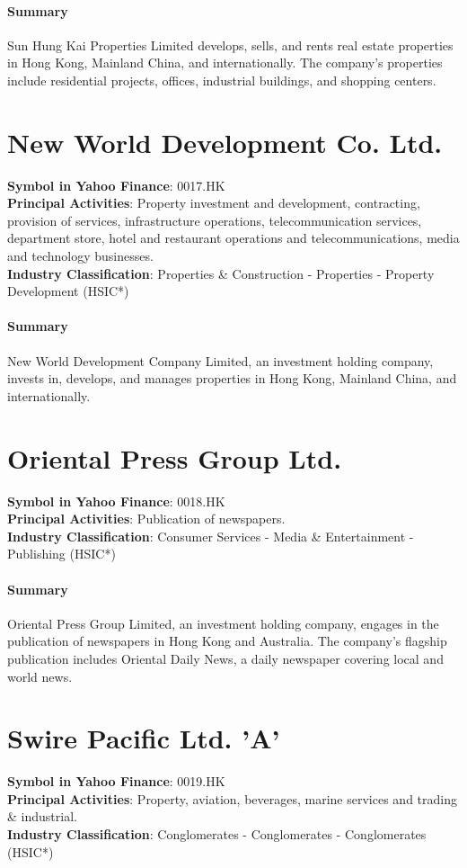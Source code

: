 \paragraph{Summary}
Sun Hung Kai Properties Limited develops, sells, and rents real estate properties in Hong Kong, Mainland China, and internationally. The company's properties include residential projects, offices, industrial buildings, and shopping centers.


\section{New World Development Co. Ltd.}
\textbf{Symbol in Yahoo Finance}: 0017.HK\\
\textbf{Principal Activities}: Property investment and development, contracting, provision of services, infrastructure operations, telecommunication services, department store, hotel and restaurant operations and telecommunications, media and technology businesses.\\
\textbf{Industry Classification}: Properties \& Construction - Properties - Property Development (HSIC*)
\paragraph{Summary}
New World Development Company Limited, an investment holding company, invests in, develops, and manages properties in Hong Kong, Mainland China, and internationally.


\section{Oriental Press Group Ltd.}
\textbf{Symbol in Yahoo Finance}: 0018.HK\\
\textbf{Principal Activities}: Publication of newspapers.\\
\textbf{Industry Classification}: Consumer Services - Media \& Entertainment - Publishing (HSIC*)
\paragraph{Summary}
Oriental Press Group Limited, an investment holding company, engages in the publication of newspapers in Hong Kong and Australia. The company's flagship publication includes Oriental Daily News, a daily newspaper covering local and world news.


\section{Swire Pacific Ltd. 'A'}
\textbf{Symbol in Yahoo Finance}: 0019.HK\\
\textbf{Principal Activities}: Property, aviation, beverages, marine services and trading \& industrial.\\
\textbf{Industry Classification}: Conglomerates - Conglomerates - Conglomerates (HSIC*)

